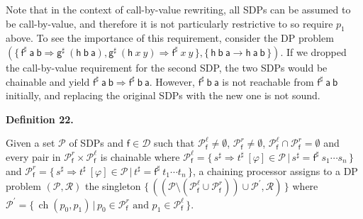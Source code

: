 Note that in the context of call-by-value rewriting, all SDPs can be assumed to be call-by-value, and therefore it is not particularly restrictive to so require $p_{1}$ above. To see the importance of this requirement, consider the DP problem $(\{\,{{{\mathsf{f}^{\sharp}}\ {\mathsf{a}}}\ {\mathsf{b}}}\Rightarrow{{\mathsf{g}^{\sharp}}\ {({{\mathsf{h}}\ {\mathsf{b}}}\ {\mathsf{a}})}},{{\mathsf{g}^{\sharp}}\ {({{\mathsf{h}}\ {x}}\ {y})}}\Rightarrow{{{\mathsf{f}^{\sharp}}\ {x}}\ {y}}\,\},\{\,{{\mathsf{h}}\ {\mathsf{b}}}\ {\mathsf{a}}\rightarrow{{\mathsf{h}}\ {\mathsf{a}}}\ {\mathsf{b}}\,\})$. If we dropped the call-by-value requirement for the second SDP, the two SDPs would be chainable and yield ${{{\mathsf{f}^{\sharp}}\ {\mathsf{a}}}\ {\mathsf{b}}}\Rightarrow{{{\mathsf{f}^{\sharp}}\ {\mathsf{b}}}\ {\mathsf{a}}}$. However, ${{\mathsf{f}^{\sharp}}\ {\mathsf{b}}}\ {\mathsf{a}}$ is not reachable from ${{\mathsf{f}^{\sharp}}\ {\mathsf{a}}}\ {\mathsf{b}}$ initially, and replacing the original SDPs with the new one is not sound.\par
 
 
 
\par\medskip\noindent\textbf{Definition 22.}\par
 
 
Given a set $\mathcal{P}$ of SDPs and $\mathsf{f}\in\mathcal{D}$ such that $\mathcal{P}_{\mathsf{f}}^{\ell}\neq\emptyset$, $\mathcal{P}_{\mathsf{f}}^{r}\neq\emptyset$, $\mathcal{P}_{\mathsf{f}}^{\ell}\cap\mathcal{P}_{\mathsf{f}}^{r}=\emptyset$ and every pair in $\mathcal{P}_{\mathsf{f}}^{r}\times\mathcal{P}_{\mathsf{f}}^{\ell}$ is chainable where $\mathcal{P}_{\mathsf{f}}^{\ell}=\{\,{s^{\sharp}}\Rightarrow{t^{\sharp}}\ [\varphi]\in\mathcal{P}\,|\,s^{\sharp}={\mathsf{f}^{\sharp}}\ {{s}_{1}\cdots{s}_{n}}\,\}$ and $\mathcal{P}_{\mathsf{f}}^{r}=\{\,{s^{\sharp}}\Rightarrow{t^{\sharp}}\ [\varphi]\in\mathcal{P}\,|\,t^{\sharp}={\mathsf{f}^{\sharp}}\ {{t}_{1}\cdots{t}_{n}}\,\}$, a chaining processor assigns to a DP problem $(\mathcal{P},\mathcal{R})$ the singleton $\{\,((\mathcal{P}\setminus(\mathcal{P}_{\mathsf{f}}^{\ell}\cup\mathcal{P}_{\mathsf{f}}^{r}))\cup\mathcal{P}^{\prime},\mathcal{R})\,\}$ where $\mathcal{P}^{\prime}=\{\,\operatorname{ch}(p_{0},p_{1})\,|\,p_{0}\in\mathcal{P}_{\mathsf{f}}^{r}\text{ and }p_{1}\in\mathcal{P}_{\mathsf{f}}^{\ell}\,\}$.\par
 
